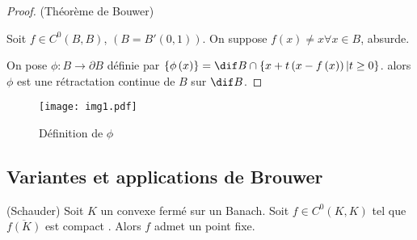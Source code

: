 \begin{proof}
	(Théorème de Bouwer)

	Soit $f \in C^0\left( B,B \right) $, $\left( B = B'\left( 0,1 \right)  \right) $.
	On suppose $f\left( x \right) \neq  x \forall x \in B$, absurde.

	On pose $\phi : B \to  \partial B$ définie par $\{\phi\left( x \right) \} = \dif B \cap \{x + t\left( x-f\left( x \right)  \right) | t\ge 0\} $. alors $\phi $ est une rétractation continue de $B$ sur $\dif B$.
\end{proof}
\begin{figure}[htpb]
	\centering
	\texttt{[image: img1.pdf]}
	\caption{Définition de $\phi$}
\end{figure}
\subsection{Variantes et applications de Brouwer}

\begin{theoreme}
	(Schauder) 
	Soit $K$ un convexe fermé sur un Banach. Soit $f \in C ^0\left( K,K \right) $ tel que $\overline{f\left( K \right) }$ est compact . Alors $f$ admet un point fixe.
\end{theoreme}



